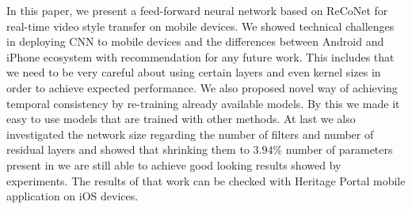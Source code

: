 \documentclass[a4paper,conference]{IEEEtran}
\begin{document}
In this paper, we present a feed-forward neural network based on ReCoNet \cite{Reconet} for real-time video style transfer on mobile devices. We showed technical challenges in deploying CNN to mobile devices and the differences between Android and iPhone ecosystem with recommendation for any future work. This includes that we need to be very careful about using certain layers and even kernel sizes in order to achieve expected performance. We also proposed novel way of achieving temporal consistency by re-training already available models. By this we made it easy to use models that are trained with other methods. At last we also investigated the network size regarding the number of filters and number of residual layers and showed that shrinking them to $3.94\%$ number of parameters present in \cite{Reconet} we are still able to achieve good looking results showed by experiments. The results of that work can be checked with Heritage Portal mobile application on iOS devices.


%




\end{document}
